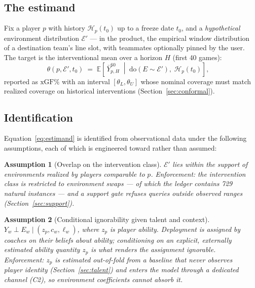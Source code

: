 \documentclass[11pt]{article}
\newtheorem{assumption}{Assumption}
\newcommand{\E}{\mathbb{E}}
\newcommand{\doop}[1]{\mathrm{do}(#1)}
\begin{document}
\subsection{The estimand}

Fix a player $p$ with history $\mathcal{H}_p(t_0)$ up to a freeze date $t_0$, and a
\emph{hypothetical} environment distribution $\mathcal{E}'$ --- in the product, the empirical
window distribution of a destination team's line slot, with teammates optionally pinned by
the user. The target is the interventional mean over a horizon $H$ (first 40 games):
\begin{equation}
\theta(p, \mathcal{E}', t_0) \;=\;
\E\!\left[\, \bar{Y}^{60}_{p,H} \;\middle|\; \doop{E \sim \mathcal{E}'},\; \mathcal{H}_p(t_0) \right],
\label{eq:estimand}
\end{equation}
reported as $\mathrm{xGF}\%$ with an interval $[\theta_L, \theta_U]$ whose nominal coverage
must match realized coverage on historical interventions (Section~\ref{sec:conformal}).

\subsection{Identification}

Equation~\eqref{eq:estimand} is identified from observational data under the following
assumptions, each of which is engineered toward rather than assumed:

\begin{assumption}[Overlap on the intervention class]\label{as:overlap}
$\mathcal{E}'$ lies within the support of environments realized by players comparable to
$p$. \emph{Enforcement:} the intervention class is restricted to environment swaps ---
of which the ledger contains 729 natural instances --- and a support gate refuses queries
outside observed ranges (Section~\ref{sec:support}).
\end{assumption}

\begin{assumption}[Conditional ignorability given talent and context]\label{as:ignor}
$Y_w \perp E_w \mid (z_p, c_w, \ell_w)$, where $z_p$ is player ability. Deployment is
assigned by coaches \emph{on their beliefs about ability}; conditioning on an explicit,
externally estimated ability quantity $z_p$ is what renders the assignment ignorable.
\emph{Enforcement:} $z_p$ is estimated out-of-fold from a baseline that never observes
player identity (Section~\ref{sec:talent}) and enters the model through a dedicated channel
(C2), so environment coefficients cannot absorb it.
\end{assumption}
\end{document}
